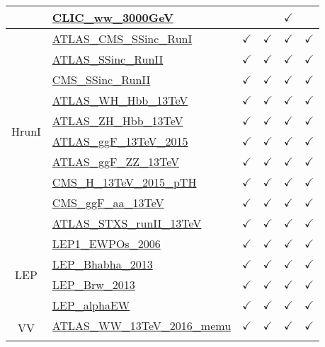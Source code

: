 \documentclass{article}
\begin{document}
\begin{longtable}{|c|l|c|c|c|c|}
 & \href{https://arxiv.org}{CLIC_ww_3000GeV}  &  &  & $\checkmark$ & 
\\ \hline
\multirow{10}{*}{HrunI}
 & \href{https://arxiv.org}{ATLAS_CMS_SSinc_RunI}  & $\checkmark$ & $\checkmark$ & $\checkmark$ & $\checkmark$\\ \cline{2-6}
 & \href{https://arxiv.org}{ATLAS_SSinc_RunII}  & $\checkmark$ & $\checkmark$ & $\checkmark$ & $\checkmark$\\ \cline{2-6}
 & \href{https://arxiv.org}{CMS_SSinc_RunII}  & $\checkmark$ & $\checkmark$ & $\checkmark$ & $\checkmark$\\ \cline{2-6}
 & \href{https://arxiv.org}{ATLAS_WH_Hbb_13TeV}  & $\checkmark$ & $\checkmark$ & $\checkmark$ & $\checkmark$\\ \cline{2-6}
 & \href{https://arxiv.org}{ATLAS_ZH_Hbb_13TeV}  & $\checkmark$ & $\checkmark$ & $\checkmark$ & $\checkmark$\\ \cline{2-6}
 & \href{https://arxiv.org}{ATLAS_ggF_13TeV_2015}  & $\checkmark$ & $\checkmark$ & $\checkmark$ & $\checkmark$\\ \cline{2-6}
 & \href{https://arxiv.org}{ATLAS_ggF_ZZ_13TeV}  & $\checkmark$ & $\checkmark$ & $\checkmark$ & $\checkmark$\\ \cline{2-6}
 & \href{https://arxiv.org}{CMS_H_13TeV_2015_pTH}  & $\checkmark$ & $\checkmark$ & $\checkmark$ & $\checkmark$\\ \cline{2-6}
 & \href{https://arxiv.org}{CMS_ggF_aa_13TeV}  & $\checkmark$ & $\checkmark$ & $\checkmark$ & $\checkmark$\\ \cline{2-6}
 & \href{https://arxiv.org}{ATLAS_STXS_runII_13TeV}  & $\checkmark$ & $\checkmark$ & $\checkmark$ & $\checkmark$
\\ \hline
\multirow{4}{*}{LEP}
 & \href{https://arxiv.org}{LEP1_EWPOs_2006}  & $\checkmark$ & $\checkmark$ & $\checkmark$ & $\checkmark$\\ \cline{2-6}
 & \href{https://arxiv.org}{LEP_Bhabha_2013}  & $\checkmark$ & $\checkmark$ & $\checkmark$ & $\checkmark$\\ \cline{2-6}
 & \href{https://arxiv.org}{LEP_Brw_2013}  & $\checkmark$ & $\checkmark$ & $\checkmark$ & $\checkmark$\\ \cline{2-6}
 & \href{https://arxiv.org}{LEP_alphaEW}  & $\checkmark$ & $\checkmark$ & $\checkmark$ & $\checkmark$
\\ \hline
\multirow{8}{*}{VV}
 & \href{https://arxiv.org}{ATLAS_WW_13TeV_2016_memu}  & $\checkmark$ & $\checkmark$ & $\checkmark$ & $\checkmark$\\ \cline{2-6}

\end{longtable}
\end{document}
